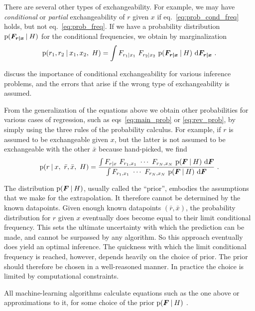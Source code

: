 \documentclass[\ifafour a4paper,12pt,\else a5paper,10pt,\fi%
onecolumn,oneside,article,%
british%
]{memoir}
\theoremstyle{remark}
\theoremstyle{innote}
\newcommand*{\di}{\mathrm{d}}%
\newcommand*{\p}{\mathrm{p}}%
\renewcommand*{\|}[1][]{\nonscript\:#1\vert\nonscript\:\mathopen{}}
\renewcommand*{\=}{\TextOrMath\texteq\eq}
\newcommand*{\eqn}{eq.}%
\newcommand*{\eqns}{eqs}%
\newcommand*{\ro}{r}
\newcommand*{\xo}{x}
\newcommand*{\rd}{\bar{r}}
\newcommand*{\xd}{\bar{x}}
\newcommand*{\yF}{\bm{F}}
\newcommand*{\yFrx}{\yF_{\bm{r\mid x}}}
\begin{document}
There are several other types of exchangeability. For example, we may have
\emph{conditional} or \emph{partial} exchangeability of $r$ given $x$ if
\eqn~\eqref{eq:prob_cond_freq} holds, but not \eqn~\eqref{eq:prob_freq}. If
we have a probability distribution $\p(\yFrx \| H)$ for the conditional
frequencies, we obtain by marginalization
\begin{equation}
  \label{eq:prob_cond_freq_integr}
  \p(r_{1}, r_{2}\| x_{1}, x_{2},\ H) = \int F_{r_{1}\|x_{1}} \ 
  F_{r_{2}\|x_{2}}\ \p(\yFrx \| H)\ \di\yFrx \ .
\end{equation}

\textcite{lindleyetal1981} discuss the importance of conditional
exchangeability for various inference problems, and the errors that arise
if the wrong type of exchangeability is assumed.

From the generalization of the equations above we obtain other
probabilities for various cases of regression, such as
\eqns~\eqref{eq:main_prob} or \eqref{eq:rev_prob}, by simply using the
three rules of the probability calculus. For example, if $\ro$ is assumed
to be exchangeable given $\xo$, but the latter is not assumed to be
exchangeable with the other $\xd$ because hand-picked, we find
\begin{equation}
  \label{eq:main_prob_exch}
  \p(\ro \| \xo,\ \rd,\xd,\ H) =
  \frac{
    \int F_{\ro\|\xo} \ F_{r_{1},x_{1}} \  \dotsm \ 
  F_{r_{N},x_{N}} \ \p(\yF \| H)\ \di\yF
  }{
    \int F_{r_{1},x_{1}} \  \dotsm \ 
  F_{r_{N},x_{N}} \ \p(\yF \| H)\ \di\yF
  } \ .
\end{equation}

The distribution $\p(\yF \| H)$, usually called the \enquote{prior},
embodies the assumptions that we make for the extrapolation. It therefore
cannot be determined by the known datapoints. Given enough known datapoints
$(\rd,\xd)$, the probability distribution for $\ro$ given $\xo$
eventually does become equal to their limit conditional frequency. This
sets the ultimate uncertainty with which the prediction can be made, and
cannot be surpassed by any algorithm. So this approach eventually does
yield an optimal inference. The quickness with which the limit conditional
frequency is reached, however, depends heavily on the choice of prior. The
prior should therefore be chosen in a well-reasoned manner. In practice the
choice is limited by computational constraints.

All machine-learning algorithms calculate equations such as the one above
or approximations to it, for some choice of the prior $\p(\yF \| H)$
\parencites{mackay1992,bishop2006}.
\end{document}
